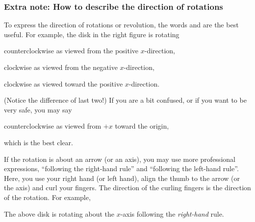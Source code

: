 \documentclass[11pt,pdfa,lastpage]{MishoNote}
\begin{document}
\subsubsection{Extra note: How to describe the direction of rotations}
\begin{minipage}[b]{0.66\textwidth}
To express the direction of rotations or revolution, the words  and  are the best useful.
For example, the disk in the right figure is rotating
\begin{miniitemize}
  \item counterclockwise as viewed from the positive $x$-direction,
  \item clockwise as viewed from the negative $x$-direction,
  \item clockwise as viewed toward the positive $x$-direction.
\end{miniitemize}
(Notice the difference of last two!) If you are a bit confused, or if you want to be very safe, you may say
\begin{miniitemize}
  \item {}counterclockwise as viewed from $+x$ toward the origin,
\end{miniitemize}
which is the best clear.
\end{minipage}\hfill
\begin{minipage}[b]{0.32\textwidth}
\vspace{3em}
\end{minipage}

\medskip

If the rotation is about an arrow (or an axis), you may use more professional expressions, ``following the right-hand rule'' and ``following the left-hand rule''.
Here, you use your right hand (or left hand), align the thumb to the arrow (or the axis) and curl your fingers. The direction of the curling fingers is the direction of the rotation. For example,
\begin{miniitemize}
  \item The above disk is rotating about the $x$-axis following the \emph{right-hand} rule.
\end{miniitemize}
\end{document}
